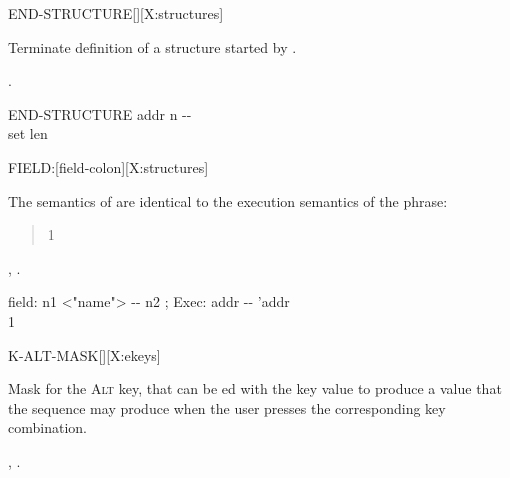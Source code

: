 \begin{worddef}{}{END-STRUCTURE}[][X:structures]
\item {}

	Terminate definition of a structure started by
	.

\see {}
	.

	\begin{implement} %

		\word{:} END-STRUCTURE\tab{} addr n -{}- \\
		\tab {} \word{!} \word{;} \tab[4.2] set len
	\end{implement}
\end{worddef}


\begin{worddef}{}{FIELD:}[field-colon][X:structures]
\item \stack{}{}

	The semantics of  are identical to the
	execution semantics of the phrase:
	\begin{quote}\ttfamily
		 1  
	\end{quote}

\see {},
	.

	\begin{implement} %

		\word{:} field:\tab{} n1 <"name"> -{}- n2 ; Exec: addr -{}- 'addr \\
		\tab {} 1   \\
		\word{;}
	\end{implement}
\end{worddef}


\begin{worddef}{}{K-ALT-MASK}[][X:ekeys]
\item {}

	Mask for the \textsc{Alt} key, that can be ed with the
	key value to produce a value that the sequence 
	 may produce when the user presses the
	corresponding key combination.

\see {},
	.
\end{worddef}


